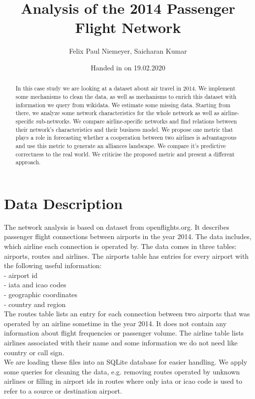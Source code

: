 \documentclass[twocolumn]{tum-article}
\title{Analysis of the 2014 Passenger Flight Network}
\author{Felix Paul Niemeyer\authormark{1},
	Saicharan Kumar\authormark{2}}
\affil[1]{felix.niemeyer@tum.de, MiM}
\affil[2]{saicharan.kumar@tum.de, MiM}
\date{Handed in on 19.02.2020}
\begin{document}
\maketitle

\begin{abstract}
In this case study we are looking at a dataset about air travel in 2014. 
We implement some mechanisms to clean the data, as well as mechanisms to enrich this dataset with information we query from wikidata.
We estimate some missing data.
Starting from there, we analyze some network characteristics for the whole network as well as airline-specific sub-networks.
We compare airline-specific networks and find relations between their network's characteristics and their business model.
We propose one metric that plays a role in forecasting whether a cooperation between two airlines is advantageous and use this metric to generate an alliances landscape.
We compare it's predictive correctness to the real world. 
We criticise the proposed metric and present a different approach. 
\end{abstract}

\section{Data Description}
The network analysis is based on dataset from openflights.org. 
It describes passenger flight connections between airports in the year 2014. 
The data includes, which airline each connection is operated by.
The data comes in three tables: airports, routes and airlines. 
The airports table has entries for every airport with the following useful information: \\
- airport id\\
- iata and icao codes\\
- geographic coordinates\\
- country and region\\

The routes table lists an entry for each connection between two airports that was operated by an airline sometime in the year 2014. It does not contain any information about flight frequencies or passenger volume. The airline table lists airlines associated with their name and some information we do not need like country or call sign. \\

We are loading these files into an SQLite database for easier handling. 
We apply some queries for cleaning the data, e.g. removing routes operated by unknown airlines or filling in airport ids in routes where only iata or icao code is used to refer to a source or destination airport. \\
\end{document}
